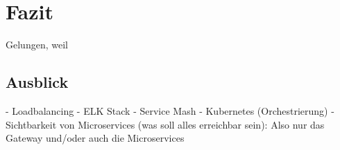 \section{Fazit}
Gelungen, weil

\subsection{Ausblick}
- Loadbalancing
- ELK Stack
- Service Mash
- Kubernetes (Orchestrierung)
- Sichtbarkeit von Microservices (was soll alles erreichbar sein): Also nur das Gateway und/oder auch die Microservices